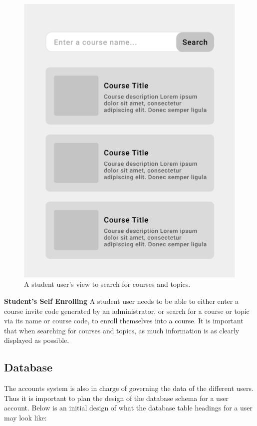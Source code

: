 \begin{figure}[h!]
  \centering
  \includegraphics[scale=0.2]{images/accounts-search}
  \caption{A student user's view to search for courses and topics.}
\end{figure}

\textbf{Student's Self Enrolling}
A student user needs to be able to either enter a course invite code generated by an administrator, or search for a course or topic via its name or course code, to enroll themselves into a course. It is important that when searching for courses and topics, as much information is as clearly displayed as possible.

\subsection{Database}
The accounts system is also in charge of governing the data of the different users. Thus it is important to plan the design of the database schema for a user account. Below is an initial design of what the database table headings for a user may look like:

